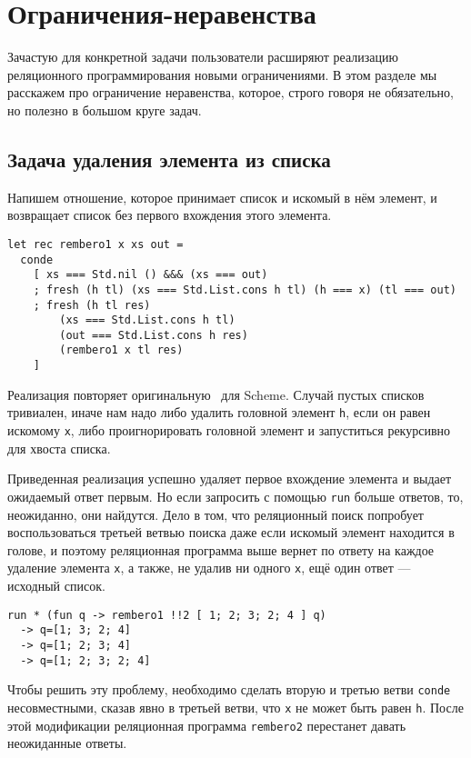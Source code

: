 
\section{Ограничения-неравенства}
\label{sec:diseq}

Зачастую для конкретной задачи пользователи расширяют реализацию реляционного программирования новыми ограничениями.
В этом разделе мы расскажем про ограничение неравенства, которое, строго говоря не обязательно, но полезно в большом круге задач.

\subsection{Задача удаления элемента из списка}

Напишем отношение, которое принимает список и искомый в нём элемент, и возвращает список без первого вхождения этого элемента.

\begin{lstlisting}
let rec rembero1 x xs out =
  conde
    [ xs === Std.nil () &&& (xs === out)
    ; fresh (h tl) (xs === Std.List.cons h tl) (h === x) (tl === out)
    ; fresh (h tl res)
        (xs === Std.List.cons h tl)
        (out === Std.List.cons h res)
        (rembero1 x tl res)
    ]
\end{lstlisting}

\noindent Реализация повторяет оригинальную~\cite{WillThesis} для Scheme. Случай пустых списков тривиален, иначе нам надо либо удалить головной элемент \verb=h=, если он равен искомому \verb=x=, либо проигнорировать головной элемент и запуститься рекурсивно для хвоста списка.

Приведенная реализация успешно удаляет первое вхождение элемента и выдает ожидаемый ответ первым.
Но если запросить с помощью \verb=run= больше ответов, то, неожиданно, они найдутся.
Дело в том, что реляционный поиск попробует воспользоваться третьей ветвью поиска даже если искомый элемент находится в голове, и поэтому реляционная программа выше вернет по ответу на каждое удаление элемента \verb=x=, а также, не удалив ни одного \verb=x=, ещё один ответ --- исходный список.

\begin{lstlisting}
run * (fun q -> rembero1 !!2 [ 1; 2; 3; 2; 4 ] q)
  -> q=[1; 3; 2; 4]
  -> q=[1; 2; 3; 4]
  -> q=[1; 2; 3; 2; 4]
\end{lstlisting}
Чтобы решить эту проблему, необходимо сделать вторую и третью ветви \verb=conde= несовместными, сказав явно в третьей ветви, что \verb=x= не может быть равен \verb=h=.
После этой модификации реляционная программа \verb=rembero2= перестанет давать неожиданные ответы.



